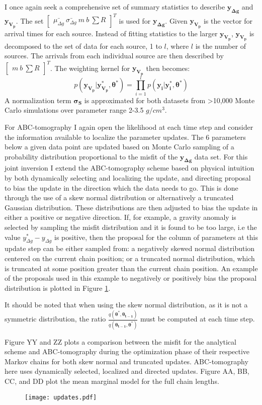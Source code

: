 I once again seek a comprehensive set of summary statistics to describe $\bm{y_{\Delta g}}$ and $\bm{y_{V_p}}$. The set $\begin{bmatrix}
\bar{\mu_{\Delta g}}\ \bar{\sigma_{\Delta g}}\ m\ b\ \sum R
\end{bmatrix}^T$ is used for $\bm{y_{\Delta g}}$. Given $\bm{y_{V_p}}$ is the vector for arrival times for each source. Instead of fitting statistics to the larger $\bm{y_{V_p}}$, $\bm{y_{V_p}}$ is decomposed to the set of data for each source, 1 to $l$, where $l$ is the number of sources. The arrivals from each individual source are then described by $\begin{bmatrix}
m\ b\ \sum R
\end{bmatrix}^T$. The weighting kernel for $\bm{y_{V_p}}$ then becomes:
\begin{equation}
	p(\bm{y_{V_p}}|\bm{y^*_{V_p}},\bm{\theta^*}) = \prod_{i = 1}^{l} p(\bm{y_i}|\bm{y^*_i},\bm{\theta^*})
\end{equation}
A normalization term $\bm{\sigma_S}$ is approximated for both datasets from >10,000 Monte Carlo simulations over parameter range 2-3.5 $g/cm^3$. \par

For ABC-tomography I again open the likelihood at each time step and consider the information available to localize the parameter updates. The 6 parameters below a given data point are updated based on Monte Carlo sampling of a probability distribution proportional to the misfit of the $\bm{y_{\Delta g}}$ data set. For this joint inversion I extend the ABC-tomography scheme based on physical intuition by both dynamically selecting and localizing the update, and directing proposal to bias the update in the direction which the data needs to go. This is done through the use of a skew normal distribution or alternatively a truncated Gaussian distribution. These distributions are then adjusted to bias the update in either a positive or negative direction. If, for example, a gravity anomaly is selected by sampling the misfit distribution and it is found to be too large, i.e the value $y^*_{\Delta g} - y_{\Delta g}$ is positive, then the proposal for the column of parameters at this update step can be either sampled from: a negatively skewed normal distribution centered on the current chain position; or a truncated normal distribution, which is truncated at some position greater than the current chain position. An example of the proposals used in this example to negatively or positively bias the proposal distribution is plotted in Figure \ref{updates}. \par
It should be noted that when using the skew normal distribution, as it is not a symmetric distribution, the ratio $\frac{q(\bm{\theta^*},\bm{\theta_{t-1}})}{q(\bm{\theta_{t-1}},\bm{\theta^*})}$ must be computed at each time step. \par
Figure YY and ZZ plots a comparison between the misfit for the analytical scheme and ABC-tomography during the optimization phase of their respective Markov chains for both skew normal and truncated updates. ABC-tomography here uses dynamically selected, localized and directed updates. Figure AA, BB, CC, and DD plot the mean marginal model for the full chain lengths. 

\begin{figure}
	\centering
	\texttt{[image: updates.pdf]}
	\caption{}
	\label{updates}
\end{figure}

